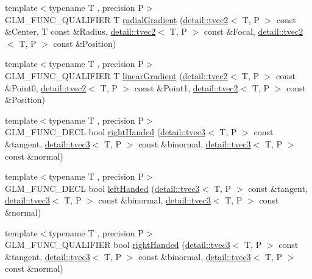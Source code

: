 \begin{DoxyCompactItemize}
\item 
{\footnotesize template$<$typename T , precision P$>$ }\\G\-L\-M\-\_\-\-F\-U\-N\-C\-\_\-\-Q\-U\-A\-L\-I\-F\-I\-E\-R T \hyperlink{group__gtx__gradient__paint_ga864c46234e363137b717119231f422f6}{radial\-Gradient} (\hyperlink{structglm_1_1detail_1_1tvec2}{detail\-::tvec2}$<$ T, P $>$ const \&Center, T const \&Radius, \hyperlink{structglm_1_1detail_1_1tvec2}{detail\-::tvec2}$<$ T, P $>$ const \&Focal, \hyperlink{structglm_1_1detail_1_1tvec2}{detail\-::tvec2}$<$ T, P $>$ const \&Position)
\item 
{\footnotesize template$<$typename T , precision P$>$ }\\G\-L\-M\-\_\-\-F\-U\-N\-C\-\_\-\-Q\-U\-A\-L\-I\-F\-I\-E\-R T \hyperlink{group__gtx__gradient__paint_ga01eb377864e98f86bd44378e1b86eb22}{linear\-Gradient} (\hyperlink{structglm_1_1detail_1_1tvec2}{detail\-::tvec2}$<$ T, P $>$ const \&Point0, \hyperlink{structglm_1_1detail_1_1tvec2}{detail\-::tvec2}$<$ T, P $>$ const \&Point1, \hyperlink{structglm_1_1detail_1_1tvec2}{detail\-::tvec2}$<$ T, P $>$ const \&Position)
\item 
{\footnotesize template$<$typename T , precision P$>$ }\\G\-L\-M\-\_\-\-F\-U\-N\-C\-\_\-\-D\-E\-C\-L bool \hyperlink{group__gtx__handed__coordinate__space_ga16517e8a56cba5ba908e6eac6500ab94}{right\-Handed} (\hyperlink{structglm_1_1detail_1_1tvec3}{detail\-::tvec3}$<$ T, P $>$ const \&tangent, \hyperlink{structglm_1_1detail_1_1tvec3}{detail\-::tvec3}$<$ T, P $>$ const \&binormal, \hyperlink{structglm_1_1detail_1_1tvec3}{detail\-::tvec3}$<$ T, P $>$ const \&normal)
\item 
{\footnotesize template$<$typename T , precision P$>$ }\\G\-L\-M\-\_\-\-F\-U\-N\-C\-\_\-\-D\-E\-C\-L bool \hyperlink{group__gtx__handed__coordinate__space_ga2c0882af0eabd0e39da5680931f586ed}{left\-Handed} (\hyperlink{structglm_1_1detail_1_1tvec3}{detail\-::tvec3}$<$ T, P $>$ const \&tangent, \hyperlink{structglm_1_1detail_1_1tvec3}{detail\-::tvec3}$<$ T, P $>$ const \&binormal, \hyperlink{structglm_1_1detail_1_1tvec3}{detail\-::tvec3}$<$ T, P $>$ const \&normal)
\item 
{\footnotesize template$<$typename T , precision P$>$ }\\G\-L\-M\-\_\-\-F\-U\-N\-C\-\_\-\-Q\-U\-A\-L\-I\-F\-I\-E\-R bool \hyperlink{group__gtx__handed__coordinate__space_ga16517e8a56cba5ba908e6eac6500ab94}{right\-Handed} (\hyperlink{structglm_1_1detail_1_1tvec3}{detail\-::tvec3}$<$ T, P $>$ const \&tangent, \hyperlink{structglm_1_1detail_1_1tvec3}{detail\-::tvec3}$<$ T, P $>$ const \&binormal, \hyperlink{structglm_1_1detail_1_1tvec3}{detail\-::tvec3}$<$ T, P $>$ const \&normal)

\end{DoxyCompactItemize}
